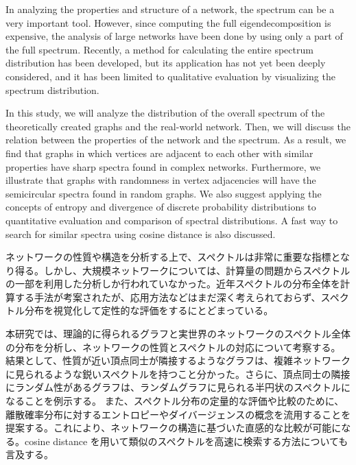 \documentclass[senior,final,11pt]{iscs-thesis}
\date{January 29, 2021}
\begin{document}
\begin{eabstract}
    In analyzing the  properties and  structure of a network, the spectrum can be a very important tool. However, since computing the full eigendecomposition is expensive, the analysis of large networks have been done by using only a part of the full spectrum. Recently, a method for calculating the entire spectrum distribution has been developed, but its application has not yet been deeply considered, and it has been limited to qualitative evaluation by visualizing the spectrum distribution.

    In this study, we will analyze the distribution of the overall spectrum of the theoretically created graphs and the real-world network. Then, we will discuss the relation between the properties of the network and the spectrum. As a result, we find that graphs in which vertices are adjacent to each other with similar properties have sharp spectra found in complex networks. Furthermore, we illustrate that graphs with randomness in vertex adjacencies will have the semicircular spectra found in random graphs. We also suggest applying the concepts of entropy and divergence of discrete probability distributions to quantitative evaluation and comparison of spectral distributions. A fast way to search for similar spectra using cosine distance is also discussed.
\end{eabstract}
\begin{jabstract}
    ネットワークの性質や構造を分析する上で、スペクトルは非常に重要な指標となり得る。しかし、大規模ネットワークについては、計算量の問題からスペクトルの一部を利用した分析しか行われていなかった。近年スペクトルの分布全体を計算する手法が考案されたが、応用方法などはまだ深く考えられておらず、スペクトル分布を視覚化して定性的な評価をするにとどまっている。

    本研究では、理論的に得られるグラフと実世界のネットワークのスペクトル全体の分布を分析し、ネットワークの性質とスペクトルの対応について考察する。 結果として、性質が近い頂点同士が隣接するようなグラフは、複雑ネットワークに見られるような鋭いスペクトルを持つこと分かった。さらに、頂点同士の隣接にランダム性があるグラフは、ランダムグラフに見られる半円状のスペクトルになることを例示する。 また、スペクトル分布の定量的な評価や比較のために、離散確率分布に対するエントロピーやダイバージェンスの概念を流用することを提案する。これにより、ネットワークの構造に基づいた直感的な比較が可能になる。cosine distance を用いて類似のスペクトルを高速に検索する方法についても言及する。
\end{jabstract}
\maketitle
\end{document}
